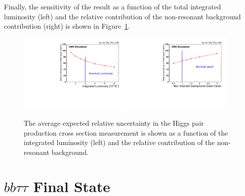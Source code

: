 Finally, the sensitivity of the result as a function of the total integrated luminosity (left) and the relative contribution of the non-resonant background contribution (right) is shown in Figure~\ref{fig:LumiScan}.

\begin{figure}[h]
  \centering
  \includegraphics[width=0.48\textwidth]{figures_chapter6/XSUncertaintyVsLumi.pdf}
 \includegraphics[width=0.48\textwidth]{figures_chapter6/XSUncertaintyVsNonResBkgScaleFactor.pdf} 
  \caption {The average expected relative uncertainty in the Higgs pair production cross section measurement is shown  as a function of the integrated luminosity (left) and the relative contribution of the non-resonant background.}
  \label{fig:LumiScan}
\end{figure}


\section{$bb\tau\tau$ Final State}

